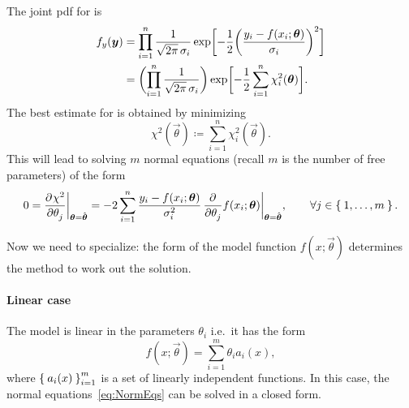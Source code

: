 The joint \ac{pdf} for  is
\begin{equation}
  \begin{aligned}
	f_{y}(\vec{y}) &= \prod_{i=1}^n \frac{1}{\sqrt{2\pi}\,\sigma_i}
	\exp\squareBrackets[\bigg]{%
	  -\frac{1}{2} \roundBrackets[\bigg]{%
		\frac{y_i - f(x_i;\vec{\theta})}{\sigma_i}
	  }^2
	}\\
	&=
	\roundBrackets[\bigg]{%
	  \prod_{i=1}^n
	  \frac{1}{\sqrt{2\pi}\,\sigma_i}
	}
	\exp\squareBrackets[\bigg]{%
	  -\frac{1}{2} \sum_{i=1}^n\chi^2_i(\vec{\theta})
	}.
  \end{aligned}
\end{equation}
The best estimate for \vec{\theta} is obtained by minimizing
\begin{equation}
	\chi^2(\vec{\theta}) \coloneqq\sum_{i=1}^n\chi^2_i(\vec{\theta}).
\end{equation}
This will lead to solving $m$ normal equations (recall $m$ is the number of free parameters) of the form
\begin{equation}\label{eq:NormEqs}
	0 = \dfrac{{\mathop{}\!\mathrm{\partial}^{}}\chi^2}{\mathop{}\!\mathrm{\partial} \theta_j^{}}\bigg\rvert_{\bm{{\theta}}=\hat{\bm{{\theta}}}}
	=
	-2
	\sum_{i=1}^n \frac{y_i - f(x_i;\bm{{\theta}})}{\sigma_i^2}\,\dfrac{{\mathop{}\!\mathrm{\partial}^{}}}{\mathop{}\!\mathrm{\partial} \theta_j^{}}f(x_i;\bm{{\theta}})\bigg\rvert_{\bm{{\theta}} =\hat{\bm{{\theta}}}},
	\qquad
	\forall j\in\Set{1,\dots,m}.
\end{equation}


Now we need to specialize: the form of the model function $f(x;\vec{\theta})$ determines the method to work out the solution.

\paragraph{Linear case}
The model is linear in the parameters $\theta_i$ i.e.~it has the form
\begin{equation}
	f(x;\vec{\theta}) = \sum_{i=1}^m \theta_ia_i(x),
\end{equation}
where $\Set{a_i(x)}_{i=1}^m$ is a set of linearly independent functions.
In this case, the normal equations~\eqref{eq:NormEqs} can be solved in a closed form.



